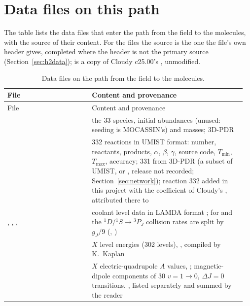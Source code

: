 \section{Data files on this path}
\label{app:data}

The table lists the data files that enter the path from the field to the
molecules, with the source of their content. For the \Htwo{} files the source
is the one the file's own header gives, completed where the header is not the
primary source (Section~\ref{sec:h2data});  is a copy of
Cloudy c25.00's , unmodified.

\begin{longtable}{@{}L{0.34\linewidth}L{0.62\linewidth}@{}}
\caption{Data files on the path from the field to the molecules.}\label{tab:datafiles}\\
\toprule
File & Content and provenance \\
\midrule
\endfirsthead
\toprule
File & Content and provenance \\
\midrule
\endhead
{} & the 33 species, initial abundances (unused: seeding is MOCASSIN's) and masses; 3D-PDR \citep{Bisbas2012} \\
 & 332 reactions in UMIST format: number, reactants, products, $\alpha$, $\beta$, $\gamma$, source code, $T_{\min}$, $T_{\max}$, accuracy; 331 from 3D-PDR (a subset of UMIST, \citealt{Woodall2007} or \citealt{McElroy2013}, release not recorded; Section~\ref{sec:network}); reaction 332 added in this project with the coefficient of Cloudy's , attributed there to \citet{Janev1987} \\
, , ,  & coolant level data in LAMDA format \citep{Schoier2005}; for  and  the $^1D$/$^1S\to{}^3P_J$ collision rates are split by $g_J/9$ (, ) \\
 & $X$ level energies (302 levels), \citet[their Table~1]{Komasa2011}, compiled by K.~Kaplan \\
 & $X$ electric-quadrupole $A$ values, \citet{Wolniewicz1998}; magnetic-dipole components of 30 $v=1\to0$, $\Delta J=0$ transitions, \citet{PachuckiKomasa2011}, listed separately and summed by the reader \\

\end{longtable}
